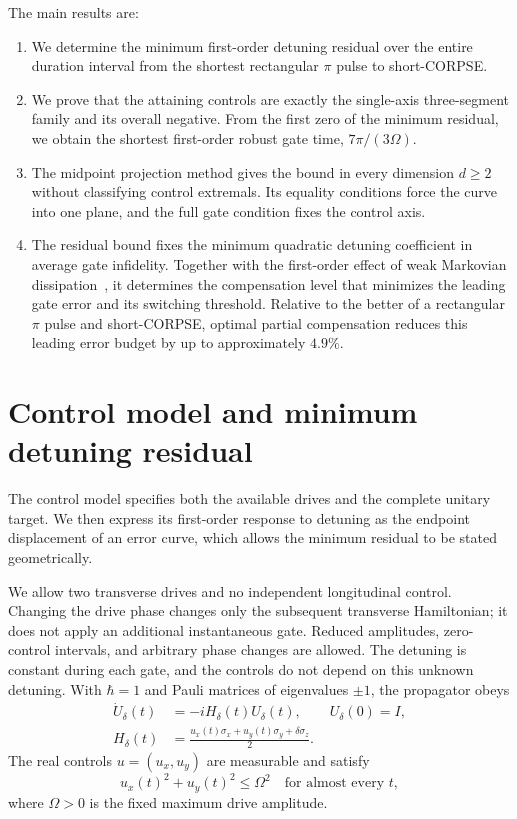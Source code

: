 \documentclass[12pt]{iopjournal}
\begin{document}
The main results are:
\begin{enumerate}
\item We determine the minimum first-order detuning residual over
the entire duration interval from the shortest rectangular $\pi$
pulse to short-CORPSE.
\item We prove that the attaining controls are exactly the single-axis
three-segment family and its overall negative. From the first zero
of the minimum residual, we obtain the shortest first-order robust
gate time, $7\pi/(3\Omega)$.
\item The midpoint projection method gives the bound in every
dimension $d\ge2$ without classifying control extremals. Its equality
conditions force the curve into one plane, and the full gate
condition fixes the control axis.
\item The residual bound fixes the minimum quadratic detuning
coefficient in average gate infidelity. Together with the first-order
effect of weak Markovian dissipation~\cite{abad2022}, it determines
the compensation level that minimizes the leading gate error and its
switching threshold. Relative to the better of a rectangular $\pi$
pulse and short-CORPSE, optimal partial compensation reduces this
leading error budget by up to approximately $4.9\%$.
\end{enumerate}

\section{Control model and minimum detuning residual}
\label{sec:model}

The control model specifies both the available drives and the complete
unitary target. We then express its first-order response to detuning
as the endpoint displacement of an error curve, which allows the
minimum residual to be stated geometrically.

We allow two transverse drives and no independent longitudinal
control. Changing the drive phase changes only the subsequent
transverse Hamiltonian; it does not apply an additional instantaneous
gate. Reduced amplitudes, zero-control intervals, and arbitrary phase
changes are allowed. The detuning is constant during each gate, and
the controls do not depend on this unknown detuning. With $\hbar=1$
and Pauli matrices of eigenvalues $\pm1$, the
propagator obeys
\begin{equation}
 \begin{aligned}
 \dot U_\delta(t)&=-iH_\delta(t)U_\delta(t),\qquad U_\delta(0)=I,\\
 H_\delta(t)&=\frac{u_x(t)\sigma_x+u_y(t)\sigma_y+\delta\sigma_z}{2}.
 \end{aligned}
 \label{eq:dynamics}
\end{equation}
The real controls $u=(u_x,u_y)$ are measurable and satisfy
\begin{equation}
 u_x(t)^2+u_y(t)^2\le\Omega^2
 \quad\text{for almost every }t,
 \label{eq:disk}
\end{equation}
where $\Omega>0$ is the fixed maximum drive amplitude.
\end{document}
